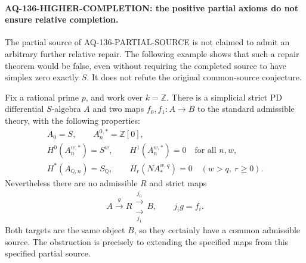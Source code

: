 \paragraph{AQ-136-HIGHER-COMPLETION: the positive partial axioms do not ensure relative completion.}
The partial source of AQ-136-PARTIAL-SOURCE is not claimed to
admit an arbitrary further relative repair. The following example
shows that such a repair theorem would be false, even without
requiring the completed source to have simplex zero exactly $S$.
It does not refute the original common-source conjecture.

Fix a rational prime $p$, and work over $k=\mathbb Z$.
There is a simplicial strict PD differential $S$-algebra $A$
and two maps $f_0,f_1:A\to B$ to the standard admissible
theory, with the following properties:
\[
 \begin{gathered}
 A_0=S,\qquad A_n^{0,*}=\mathbb Z[0],\\
 H^0(A_n^{w,*})=S^w,\qquad H^1(A_n^{w,*})=0
                                      \quad\text{for all }n,w,\\
 H^*(A_{\mathbb Q,n})=S_{\mathbb Q},\qquad
 H_r(N A_*^{w,q})=0\quad(w>q,\ r\ge0).
 \end{gathered}                                            \tag{136.HC1}
\]
Nevertheless there are no admissible $R$ and strict maps
\[
            A\xrightarrow{g}R
                    \mathrel{\substack{\xrightarrow{j_0}\\[-3pt]
                                      \xrightarrow[j_1]{}}}B,
                 \qquad j_i g=f_i.                       \tag{136.HC2}
\]
Both targets are the same object $B$, so they certainly have
a common admissible source. The obstruction is precisely to
extending the specified maps from this specified partial source.

